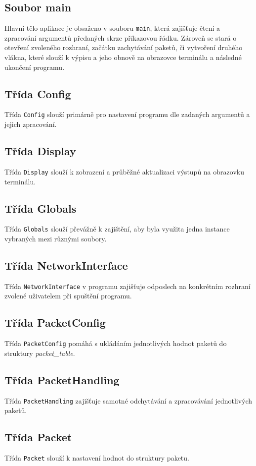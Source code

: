 \documentclass[a4paper, 11pt, hidelinks]{article}
\begin{document}
\subsection{Soubor main}
Hlavní tělo aplikace je obsaženo v souboru \verb|main|, která zajišťuje čtení a zpracování argumentů předaných skrze příkazovou řádku. Zároveň se stará o otevření zvoleného rozhraní, začátku zachytávání paketů, či vytvoření druhého vlákna, které slouží k výpisu a jeho obnově na obrazovce terminálu a následné ukončení programu.

\subsection{Třída Config}
Třída \verb|Config| slouží primárně pro nastavení programu dle zadaných argumentů a jejich zpracování.

\subsection{Třída Display}
Třída \verb|Display| slouží k zobrazení a průběžné aktualizaci výstupů na obrazovku terminálu.

\subsection{Třída Globals}
Třída \verb|Globals| slouží převážně k zajištění, aby byla využita jedna instance vybraných mezi různými soubory.

\subsection{Třída NetworkInterface}
Třída \verb|NetworkInterface| v programu zajišťuje odposlech na konkrétním rozhraní zvolené uživatelem při spuštění programu.

\subsection{Třída PacketConfig}
Třída \verb|PacketConfig| pomáhá s ukládáním jednotlivých hodnot paketů do struktury \emph{packet\_table}.

\subsection{Třída PacketHandling}
Třída \verb|PacketHandling| zajišťuje samotné odchytávání a zpracovávání jednotlivých paketů.

\subsection{Třída Packet}
Třída \verb|Packet| slouží k nastavení hodnot do struktury paketu.
\end{document}
